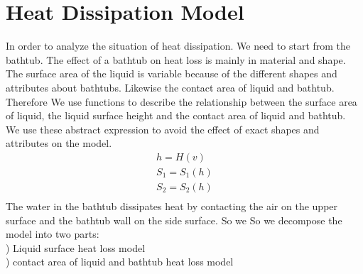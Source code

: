 \documentclass{mcmthesis}
\begin{document}
\section{Heat Dissipation Model}
In order to analyze the situation of heat dissipation. 
We need to start from the bathtub.
The effect of a bathtub on heat loss is mainly in material and shape.\\
\indent The surface area of the liquid is variable because of the different shapes and attributes about bathtubs. Likewise the contact area of liquid and bathtub. Therefore We use functions to describe the relationship between the surface area of liquid, the liquid surface height and the contact area of liquid and bathtub. \\
\indent We use these abstract expression to avoid the effect of exact shapes and attributes on the model.
\begin{equation}
\begin{split}
h=H(v)  \\
S_{1}=S_{1}(h) \\
S_{2}=S_{2}(h)  \\
\end{split}
\end{equation}
\indent The water in the bathtub dissipates heat by contacting the air on the upper surface and the bathtub wall on the side surface. So we So we decompose the model into two parts:\\
\indent {}) Liquid surface heat loss model\\
\indent {}) contact area of liquid and bathtub heat loss model
\end{document}
